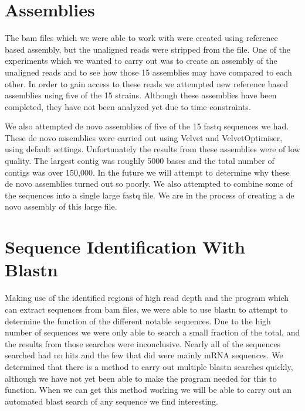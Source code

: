 \documentclass[12pt]{article}
\begin{document}
%
%
\vspace{-0.5cm}
\section{Assemblies}
\vspace{-0.5cm}
	The bam files which we were able to work with were created using reference based assembly, but the unaligned reads were stripped from the file. One of the experiments which we wanted to carry out was to create an assembly of the unaligned reads and to see how those 15 assemblies may have compared to each other. In order to gain access to these reads we attempted new reference based assemblies using five of the 15 strains. Although these assemblies have been completed, they have not been analyzed yet due to time constraints.

	We also attempted de novo assemblies of five of the 15 fastq sequences we had. These de novo assemblies were carried out using Velvet and VelvetOptimiser, using default settings. Unfortunately the results from these assemblies were of low quality. The largest contig was roughly 5000 bases and the total number of contigs was over 150,000. In the future we will attempt to determine why these de novo assemblies turned out so poorly. We also attempted to combine some of the sequences into a single large fastq file. We are in the process of creating a de novo assembly of this large file.

%
%
\vspace{-2cm}
\section{Sequence Identification With Blastn}
\vspace{-0.5cm}
	Making use of the identified regions of high read depth and the program which can extract sequences from bam files, we were able to use blastn to attempt to determine the function of the different notable sequences. Due to the high number of sequences we were only able to search a small fraction of the total, and the results from those searches were inconclusive. Nearly all of the sequences searched had no hits and the few that did were mainly mRNA sequences. We determined that there is a method to carry out multiple blastn searches quickly, although we have not yet been able to make the program needed for this to function. When we can get this method working we will be able to carry out an automated blast search of any sequence we find interesting.   
\end{document}
